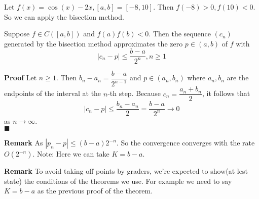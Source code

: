 \documentclass[main.tex]{subfiles}
\begin{document}
\begin{example}
    Let $f(x) = \cos(x) - 2x, [a, b] = [-8, 10]$. Then $f(-8) > 0, f(10) < 0$. So we can apply the bisection method.
\end{example}
\begin{theorem}
    Suppose $f\in C([a, b])$ and $f(a) f(b) < 0$. Then the sequence $(c_n)$ generated by the bisection method approximates the zero $p\in (a, b)$ of $f$ with  
    \begin{equation}
        |c_n - p| \le \dfrac{b - a}{2^{n}}, n \ge 1 
    \end{equation}
\end{theorem}
\par \noindent \textbf{Proof} Let $n \ge 1$. Then $b_n - a_n = \dfrac{b - a}{2^{n-1}}$ and $p\in (a_n, b_n)$ where $a_n, b_n$ are the endpoints of the interval at the $n$-th step. Because $c_n = \dfrac{a_n + b_n}{2}$, it follows that
\begin{equation}
    |c_n - p| \le \dfrac{b_n - a_n}{2} = \dfrac{b - a}{2^n} \to 0  
\end{equation}
as $n\to \infty$. 
\\ \null \hfill $\blacksquare$ 

\par \noindent \textbf{Remark} As $|p_n - p| \le (b - a) 2^{-n}$. So the convergence converges with the rate $O(2^{-n})$. Note: Here we can take $K = b - a$.
\par \noindent \textbf{Remark} To avoid taking off points by graders, we're expected to show(at lest state) the conditions of the theorems we use. For example we need to say $K = b - a $ as the previous proof of the theorem.    
\end{document}
